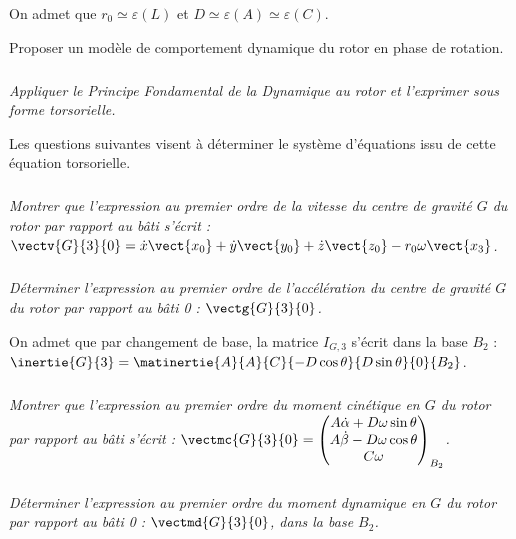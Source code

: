 \begin{multicols}{2}
On admet que $r_0\simeq \varepsilon(L)$ et $D\simeq \varepsilon(A)\simeq \varepsilon(C)$.

\begin{obj}
Proposer un modèle de comportement dynamique du rotor en phase de rotation.
\end{obj}

\subparagraph{}
\textit{Appliquer le Principe Fondamental de la Dynamique au rotor et l'exprimer
sous forme torsorielle.}
\ifprof
\begin{corrige}
\end{corrige}
\else
\fi



Les questions suivantes visent à déterminer le système d'équations issu de cette
équation torsorielle.

\subparagraph{}
\textit{Montrer que%
l'expression au premier ordre de la vitesse du centre de gravité $G$ du rotor par rapport au bâti
s'écrit : $\vectv{G}{3}{0}=\dot{x}\vect{x_0}+\dot{y}\vect{y_0}+\dot{z}\vect{z_0}-r_0\omega \vect{x_3}$.}
\ifprof
\begin{corrige}
\end{corrige}
\else
\fi


\subparagraph{}
\textit{Déterminer %
l'expression au premier
ordre de l'accélération du centre de gravité $G$ du rotor par rapport au
bâti 0 : $\vectg{G}{3}{0}$.}
\ifprof
\begin{corrige}
\end{corrige}
\else
\fi

On admet que par changement de base, la matrice $I_{G,3}$ s'écrit dans la base $B_2$ :
$\inertie{G}{3}=\matinertie{A}{A}{C}{-D\cos\theta}{D\sin\theta}{0}{B_2}$.



\subparagraph{}
\textit{Montrer que %
l'expression au premier ordre du moment cinétique en $G$ du rotor par rapport au bâti s'écrit :
$\vectmc{G}{3}{0}=\begin{pmatrix} A\dot{\alpha}+D\omega\sin\theta  \\ A\dot{ \beta }-D\omega\cos\theta \\ C\omega \end{pmatrix}_{B_2}$.
}
\ifprof
\begin{corrige}
\end{corrige}
\else
\fi


\subparagraph{}
\textit{Déterminer %
l'expression au premier ordre du moment dynamique en $G$ du rotor par rapport au bâti 0 : $\vectmd{G}{3}{0}$, dans la base $B_2$.}
\ifprof
\begin{corrige}
\end{corrige}
\else
\fi


\end{multicols}
